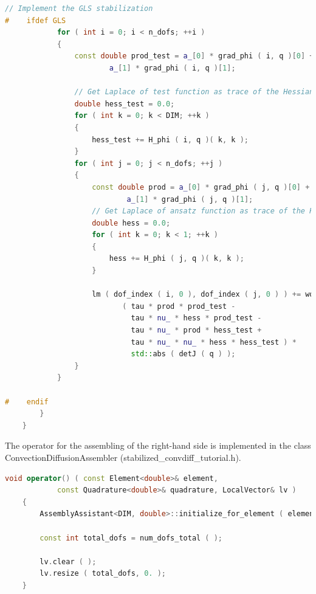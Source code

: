 \documentclass[a4paper, 11pt, twoside]{article}
\begin{document}
\begin{lstlisting}[language=C++, basicstyle={\footnotesize, \ttfamily}, keywordstyle=\color{blue}, numbers=none, tabsize=4]
            // Implement the GLS stabilization
#    ifdef GLS
            for ( int i = 0; i < n_dofs; ++i )
            {
                const double prod_test = a_[0] * grad_phi ( i, q )[0] +
                        a_[1] * grad_phi ( i, q )[1];

                // Get Laplace of test function as trace of the Hessian matrix
                double hess_test = 0.0;
                for ( int k = 0; k < DIM; ++k )
                {
                    hess_test += H_phi ( i, q )( k, k );
                }
                for ( int j = 0; j < n_dofs; ++j )
                {
                    const double prod = a_[0] * grad_phi ( j, q )[0] +
                            a_[1] * grad_phi ( j, q )[1];
                    // Get Laplace of ansatz function as trace of the Hessian matrix
                    double hess = 0.0;
                    for ( int k = 0; k < 1; ++k )
                    {
                        hess += H_phi ( j, q )( k, k );
                    }

                    lm ( dof_index ( i, 0 ), dof_index ( j, 0 ) ) += wq * 
                           ( tau * prod * prod_test -
                             tau * nu_ * hess * prod_test - 
                             tau * nu_ * prod * hess_test + 
                             tau * nu_ * nu_ * hess * hess_test ) * 
                             std::abs ( detJ ( q ) );
                }
            }

#    endif
        }
    }
\end{lstlisting}
		
The operator for the assembling of the right-hand side is implemented in the class ConvectionDiffusionAssembler (stabilized\_convdiff\_tutorial.h).
\begin{lstlisting}[language=C++, basicstyle={\footnotesize, \ttfamily}, keywordstyle=\color{blue}, numbers=none, tabsize=4]
    void operator() ( const Element<double>& element,
            const Quadrature<double>& quadrature, LocalVector& lv )
    {
        AssemblyAssistant<DIM, double>::initialize_for_element ( element, quadrature );

        const int total_dofs = num_dofs_total ( );

        lv.clear ( );
        lv.resize ( total_dofs, 0. );
    }
\end{lstlisting}
\end{document}
